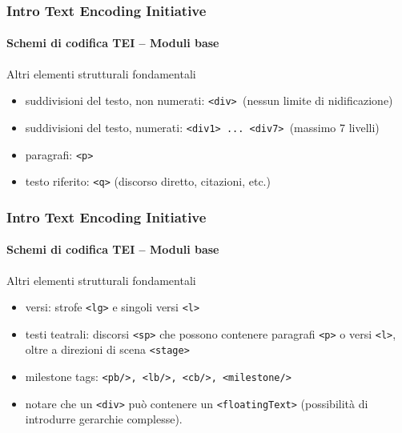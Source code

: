 


\begin{frame}
	\frametitle{Intro Text Encoding Initiative}
	\framesubtitle{Schemi di codifica TEI – Moduli base}
	\addtocounter{nframe}{1}

	\begin{block}{Altri elementi strutturali fondamentali}
        \begin{itemize}
            \item suddivisioni del testo, non numerati: \texttt{<div> }(nessun limite di nidificazione)
            \item suddivisioni del testo, numerati: \texttt{<div1> ... <div7> }(massimo 7 livelli)
            \item paragrafi: \texttt{<p>}
            \item testo riferito: \texttt{<q>} (discorso diretto, citazioni, etc.)
        \end{itemize}
        
    \end{block}
\end{frame}


\begin{frame}
	\frametitle{Intro Text Encoding Initiative}
	\framesubtitle{Schemi di codifica TEI – Moduli base}
	\addtocounter{nframe}{1}

	\begin{block}{Altri elementi strutturali fondamentali}
        \begin{itemize}
            \item versi: strofe \texttt{<lg>} e singoli versi \texttt{<l>}
            \item testi teatrali: discorsi \texttt{<sp>} che possono contenere paragrafi
            \texttt{<p>} o versi \texttt{<l>}, oltre a direzioni di scena \texttt{<stage>}
            \item milestone tags: \texttt{<pb/>, <lb/>, <cb/>, <milestone/>}
            \item notare che un \texttt{<div>} può contenere un \texttt{<floatingText>} (possibilità di introdurre gerarchie complesse).
        \end{itemize}
        
    \end{block}

\end{frame}

